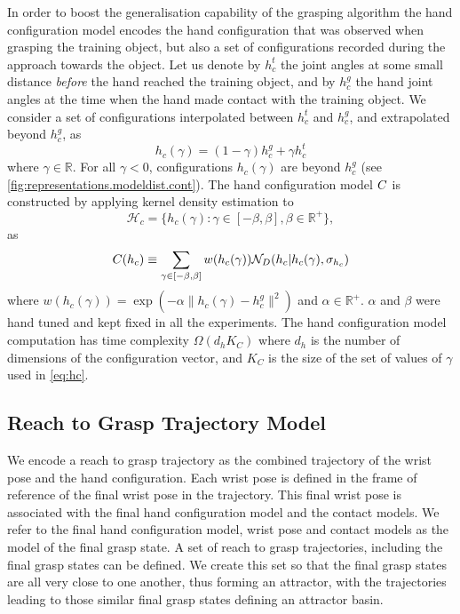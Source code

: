 In order to boost the generalisation capability of the grasping algorithm the hand configuration model encodes the hand configuration that was observed when grasping the training object, but also a set of configurations recorded during the approach towards the object. Let us denote by $h^t_c$ the joint angles at some small distance \emph{before} the hand reached the training object, and by $h^g_c$ the hand joint angles at the time when the hand made contact with the training object. We consider a set of configurations interpolated between $h^t_c$ and $h^g_c$, and extrapolated beyond $h^g_c$, as
\begin{equation}
h_c(\gamma) = (1 - \gamma)h^g_c + \gamma h^t_c
\label{eq:learning.configmodel.config}
\end{equation}
\noindent where $\gamma \in \mathbb R$. For all $\gamma < 0$, configurations $h_c(\gamma)$ are beyond $h^g_c$ (see \fig\ref{fig:representations.modeldist.cont}). The hand configuration model $C$ is constructed by applying kernel density estimation to \begin{equation}\label{eq:H_c}\mathcal H_c = \lbrace h_c(\gamma): \gamma \in [-\beta, \beta], \beta \in \mathbb R^{+}\rbrace,\end{equation} as 
\begin{equation}
C(h_c) \equiv \sum_{\gamma \in [-\beta, \beta]} w({h_c(\gamma)}) \mathcal{N}_D(h_c|h_c(\gamma), \sigma_{h_c}) 
\label{eq:hc}
\end{equation}
where  $w({h_c(\gamma)}) = \exp(-\alpha \|h_c(\gamma) - h^g_c \|^2)$ and $\alpha \in \mathbb R^{+}$. $\alpha$ and $\beta$ were hand tuned and kept fixed in all the experiments. The hand configuration model computation has time complexity $\Omega(d_h K_C)$ where $d_h$ is the number of dimensions of the configuration vector, and $K_C$ is the size of the set of values of $\gamma$ used in \eq\eqref{eq:hc}.

\subsection{Reach to Grasp Trajectory Model}

We encode a reach to grasp trajectory as the combined trajectory of the wrist pose and the hand configuration. Each wrist pose is defined in the frame of reference of the final wrist pose in the trajectory. This final wrist pose is associated with the final hand configuration model and the contact models. We refer to the final hand configuration model, wrist pose and contact models as the model of the final grasp state.  A set of reach to grasp trajectories, including the final grasp states can be defined. We create this set so that the final grasp states are all very close to one another, thus forming an attractor, with the trajectories leading to those similar final grasp states defining an attractor basin.
